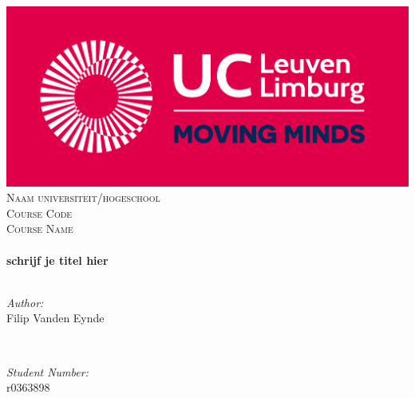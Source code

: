 \begin{titlepage}
	\centering
    \vspace*{0.5 cm}
    \includegraphics[scale = 0.5]{./img/logo_ucleuvenlimburg_rgb.png}\\[1cm]%
    \textsc{\LARGE Naam universiteit/hogeschool}\\[2.0 cm]	%
	\textsc{\Large Course Code}\\[1.5 cm]				%
	\textsc{\Large Course Name}\\[0.5 cm]				%
	\HRule \\[0.4cm]
	{\huge \bfseries schrijf je titel hier}\\[0.4cm]
	\HRule \\[1.5cm]

	\begin{minipage}{0.4\textwidth}
		\begin{flushleft} \large
			\emph{Author:}\\
			Filip Vanden Eynde
			\end{flushleft}
			\end{minipage}~
			\begin{minipage}{0.4\textwidth}
			\begin{flushright} \large
			\emph{Student Number:} \\
			r0363898									%
		\end{flushright}
	\end{minipage}\\[2 cm]
	
	
	{\large \thedate}%
 
	\vfill
	
\end{titlepage}
